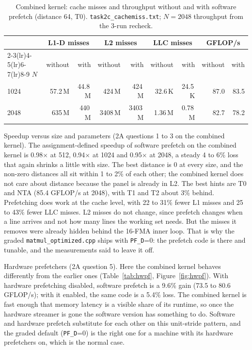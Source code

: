 \documentclass[11pt,a4paper]{article}
\begin{document}
\begin{table}[H]
\centering\small
\caption{Combined kernel: cache misses and throughput without and with software prefetch (distance 64, T0). \texttt{task2c\_cachemiss.txt}; $N=2048$ throughput from the 3-run recheck.}
\setlength{\tabcolsep}{4pt}\footnotesize
\begin{tabular}{l rr rr rr rr}
\toprule
& \multicolumn{2}{c}{L1-D misses} & \multicolumn{2}{c}{L2 misses} & \multicolumn{2}{c}{LLC misses} & \multicolumn{2}{c}{GFLOP/s} \\
\cmidrule(lr){2-3}\cmidrule(lr){4-5}\cmidrule(lr){6-7}\cmidrule(lr){8-9}
$N$ & without & with & without & with & without & with & without & with \\
\midrule
1024 & 57.2\,M & 44.8\,M & 424\,M & 424\,M & 32.6\,K & 24.5\,K & 87.0 & 83.5 \\
2048 & 635\,M & 440\,M & 3408\,M & 3403\,M & 1.36\,M & 0.78\,M & 82.7 & 78.2 \\
\bottomrule
\end{tabular}
\end{table}

Speedup versus size and parameters (2A questions 1 to 3 on the combined kernel). The assignment-defined speedup of software prefetch on the combined kernel is 0.98$\times$ at 512, 0.94$\times$ at 1024 and 0.95$\times$ at 2048, a steady 4 to 6\% loss that again shrinks a little with size. The best distance is 0 at every size, and the non-zero distances all sit within 1 to 2\% of each other; the combined kernel does not care about distance because the panel is already in L2. The best hints are T0 and NTA (85.4 GFLOP/s at 2048), with T1 and T2 about 3\% behind. Prefetching does work at the cache level, with 22 to 31\% fewer L1 misses and 25 to 43\% fewer LLC misses. L2 misses do not change, since prefetch changes when a line arrives and not how many lines the working set needs. But the misses it removes were already hidden behind the 16-FMA inner loop. That is why the graded \texttt{matmul\_optimized.cpp} ships with \texttt{PF\_D}=0: the prefetch code is there and tunable, and the measurements said to leave it off.

Hardware prefetchers (2A question 5). Here the combined kernel behaves differently from the earlier ones (Table~\ref{tab:hwpf}, Figure~\ref{fig:hwpf}). With hardware prefetching disabled, software prefetch is a 9.6\% gain (73.5 to 80.6 GFLOP/s); with it enabled, the same code is a 5.4\% loss. The combined kernel is fast enough that memory latency is a visible share of its runtime, so once the hardware streamer is gone the software version has something to do. Software and hardware prefetch substitute for each other on this unit-stride pattern, and the graded default (\texttt{PF\_D}=0) is the right one for a machine with its hardware prefetchers on, which is the normal case.
\end{document}
